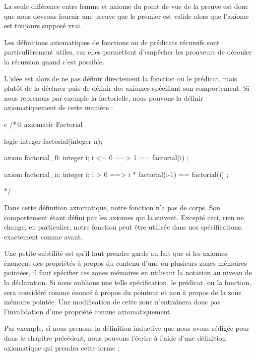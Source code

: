 La seule différence entre lemme et axiome du point de vue de la preuve est donc
que nous devrons fournir une preuve que le premier est valide alors que l'axiome
est toujours supposé vrai.





Les définitions axiomatiques de fonctions ou de prédicats récursifs sont
particulièrement utiles, car elles permettent d'empêcher les prouveurs de
dérouler la récursion quand c'est possible.



L'idée est alors de ne pas définir directement la fonction ou le prédicat, mais
plutôt de la déclarer puis de définir des axiomes spécifiant son comportement.
Si nous reprenons par exemple la factorielle, nous pouvons la définir
axiomatiquement de cette manière :



\begin{CodeBlock}{c}
/*@
  axiomatic Factorial{
    logic integer factorial(integer n);

    axiom factorial_0:
      \forall integer i; i <= 0 ==> 1 == factorial(i) ;

    axiom factorial_n:
      \forall integer i; i > 0 ==> i * factorial(i-1) == factorial(i) ;
  }
*/
\end{CodeBlock}



Dans cette définition axiomatique, notre fonction n'a pas de corps. Son
comportement étant défini par les axiomes qui la suivent. Excepté ceci,
rien ne change, en particulier, notre fonction peut être utilisée dans nos
spécifications, exactement comme avant.


Une petite subtilité
est qu'il faut prendre garde au fait que si les axiomes énoncent des propriétés
à propos du contenu d'une ou plusieurs zones mémoires pointées, il faut
spécifier ces zones mémoires en utilisant la notation  au niveau de
la déclaration. Si nous oublions une telle spécification, le prédicat, ou la
fonction, sera considéré comme énoncé à propos du pointeur et non à propos de la
zone mémoire pointée. Une modification de cette zone n'entraînera donc pas
l'invalidation d'une propriété connue axiomatiquement.


Par exemple, si nous prenons la définition inductive que nous avons rédigée pour
 dans le chapitre précédent, nous pouvons l'écrire à l'aide
d'une définition axiomatique qui prendra cette forme :



